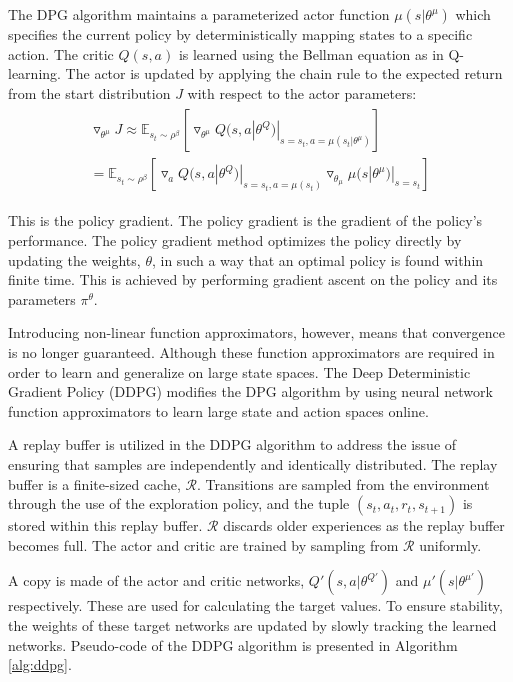 The DPG algorithm maintains a parameterized actor function $\mu(s|\theta^\mu)$ which specifies the current policy by deterministically mapping states to a specific action. The critic $Q(s,a)$ is learned using the Bellman equation as in Q-learning. The actor is updated by applying the chain rule to the expected return from the start distribution $J$ with respect to the actor parameters:
\begin{align}
\begin{split}
\triangledown_{\theta^\mu}J\approx\mathbb{E}_{s_t\sim\rho^\beta}[\triangledown_{\theta^\mu}Q(s,a|\theta^Q)|_{s=s_t,a=\mu(s_t|\theta^\mu)}] \\
= \mathbb{E}_{s_t\sim\rho^\beta}[\triangledown_aQ(s,a|\theta^Q)|_{s=s_t,a=\mu(s_t)}\triangledown_{\theta_\mu}\mu(s|\theta^\mu)|_{s=s_t}]
\end{split}
\end{align}

This is the policy gradient. The policy gradient is the gradient of the policy's performance. The policy gradient method optimizes the policy directly by updating the weights, $\theta$, in such a way that an optimal policy is found within finite time. This is achieved by performing gradient ascent on the policy and its parameters $\pi^\theta$.

Introducing non-linear function approximators, however, means that convergence is no longer guaranteed. Although these function approximators are required in order to learn and generalize on large state spaces. The Deep Deterministic Gradient Policy (DDPG) modifies the DPG algorithm by using neural network function approximators to learn large state and action spaces online.

A replay buffer is utilized in the DDPG algorithm to address the issue of ensuring that samples are independently and identically distributed. The replay buffer is a finite-sized cache, $\mathcal{R}$. Transitions are sampled from the environment through the use of the exploration policy, and the tuple $(s_t,a_t,r_t,s_{t+1})$ is stored within this replay buffer. $\mathcal{R}$ discards older experiences as the replay buffer becomes full. The actor and critic are trained by sampling from $\mathcal{R}$ uniformly. 

A copy is made of the actor and critic networks, $Q'(s,a|\theta^{Q'})$ and $\mu'(s|\theta^{\mu'})$ respectively. These are used for calculating the target values. To ensure stability, the weights of these target networks are updated by slowly tracking the learned networks. Pseudo-code of the DDPG algorithm is presented in Algorithm \ref{alg:ddpg}.

